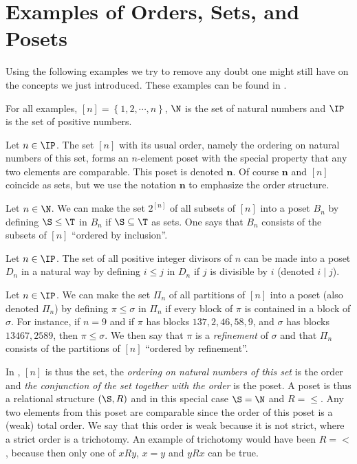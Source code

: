 \section{Examples of Orders, Sets, and Posets}


Using the following examples we try to remove any doubt one might still have on the
concepts we just introduced. These examples can be found in
\citet*{Stanley:2011:ECV:2124415}.

For all examples, $[n] = \left\{{1, 2, \cdots, n}\right\}$, $\N$ is the set
of natural numbers and $\IP$ is the set of positive numbers.

\begin{example}
\label{ex:poset:def}

\item\label{ex:poset:def:a} Let $n \in \IP$. The set $[n]$ with its usual order,
namely the ordering on natural numbers of this set, forms an $n$-element poset
with the special property that any two elements are comparable. This poset is
denoted $\bm{n}$. Of course $\bm{n}$ and $[n]$ coincide as sets, but we use the
notation $\bm{n}$ to emphasize the order structure.

\item\label{ex:poset:def:b} Let $n \in \N$. We can make the set $2^{[n]}$ of
all subsets of $[n]$ into a poset $B_n$ by defining $\S \leq \T$ in $B_n$ if $\S
\subseteq \T$ as sets. One says that $B_n$ consists of the subsets of $[n]$
``ordered by inclusion''.

\item\label{ex:poset:def:c}  Let $n \in \IP$. The set of all positive integer
divisors of $n$ can be made into a poset $D_n$ in a natural way by defining $i
\leq j$ in $D_n$ if $j$ is divisible by $i$ (denoted $i \mid j$).

\item\label{ex:poset:def:d}  Let $n \in \IP$. We can make the set $\Pi_n$ of all
partitions of $[n]$ into a poset (also denoted $\Pi_n$) by defining $\pi \leq
\sigma$ in $\Pi_n$ if every block of $\pi$ is contained in a block of $\sigma$.
For instance, if $n = 9$ and if $\pi$ has blocks $137, 2, 46, 58, 9$, and
$\sigma$ has blocks $13467, 2589$, then $\pi \leq \sigma$. We then say that
$\pi$ is a \emph{refinement} of $\sigma$ and that $\Pi_n$ consists of the
partitions of $[n]$ ``ordered by refinement''.
\end{example}


In , $[n]$ is thus the set, the \emph{ordering on natural
numbers of this set} is the order and \emph{the conjunction of the set together
with the order} is the poset. A poset is thus a relational structure $(\S, R)$
and in this special case $\S = \N$ and $R = \le$. Any two elements from this
poset are comparable since the order of this poset is a (weak) total order. We
say that this order is weak because it is not strict, where a strict order is a
trichotomy. An example of trichotomy would have been $R = <$, because then only
one of $x R y$, $x = y$ and $y R x$ can be true.



